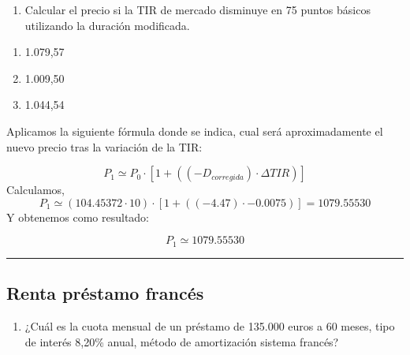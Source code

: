 \documentclass[
  letterpaper,
  DIV=11,
  numbers=noendperiod]{scrreprt}
\providecommand{\tightlist}{%
  \setlength{\itemsep}{0pt}\setlength{\parskip}{0pt}}\usepackage{longtable,booktabs,array}
\begin{document}
\begin{tcolorbox}
\begin{enumerate}
\def\labelenumi{\arabic{enumi}.}
\setcounter{enumi}{1}
\tightlist
\item
  Calcular el precio si la TIR de mercado disminuye en 75 puntos básicos
  utilizando la duración modificada.
\end{enumerate}

\begin{enumerate}
\def\labelenumi{\alph{enumi}.}
\item
  1.079,57
\item
  1.009,50
\item
  1.044,54
\end{enumerate}

\begin{tcolorbox}[enhanced jigsaw, toprule=.15mm, left=2mm, breakable, opacitybacktitle=0.6, toptitle=1mm, coltitle=black, arc=.35mm, leftrule=.75mm, bottomtitle=1mm, titlerule=0mm, title=\textcolor{quarto-callout-tip-color}{\faLightbulb}\hspace{0.5em}{Solución}, rightrule=.15mm, opacityback=0, bottomrule=.15mm, colback=white, colframe=quarto-callout-tip-color-frame, colbacktitle=quarto-callout-tip-color!10!white]

Aplicamos la siguiente fórmula donde se indica, cual será
aproximadamente el nuevo precio tras la variación de la TIR:

\[P_1\simeq P_0\cdot\left[1+((-D_{corregida})\cdot\Delta TIR)\right]\]
Calculamos,
\[P_1\simeq \left(104.45372\cdot 10\right)\cdot \left[1+\left(\left(-4.47\right)\cdot -0.0075\right)\right]=1079.55530\]
Y obtenemos como resultado:

\[P_1\simeq 1079.55530\]

\end{tcolorbox}

\begin{center}\rule{0.5\linewidth}{0.5pt}\end{center}

\subsection{Renta préstamo francés}\label{renta-pruxe9stamo-francuxe9s}

\begin{enumerate}
\def\labelenumi{\arabic{enumi}.}
\setcounter{enumi}{28}
\tightlist
\item
  ¿Cuál es la cuota mensual de un préstamo de 135.000 euros a 60 meses,
  tipo de interés 8,20\% anual, método de amortización sistema francés?
\end{enumerate}


\end{tcolorbox}
\end{document}
